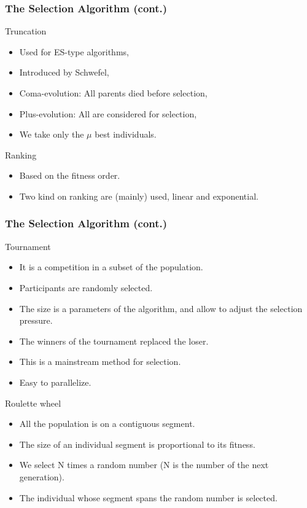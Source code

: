\begin{frame}
  \frametitle{The Selection Algorithm (cont.)}
  \begin{block}{Truncation}
    \begin{itemize}
    \item Used for ES-type algorithms,
    \item Introduced by Schwefel\cite{schwefel1995},
    \item Coma-evolution: All parents died before selection,
    \item Plus-evolution: All are considered for selection,
    \item We take only the $\mu$ best individuals.
    \end{itemize}
  \end{block}

  \begin{block}{Ranking}
    \begin{itemize}
    \item Based on the fitness order.
    \item Two kind on ranking are (mainly) used, linear and exponential.
    \end{itemize}
  \end{block}
\end{frame}

\begin{frame}
  \frametitle{The Selection Algorithm (cont.)}
  \begin{block}{Tournament}
    \begin{itemize}
    \item It is a competition in a subset of the population.
    \item Participants are randomly selected.
    \item The size is a parameters of the algorithm, and allow to
      adjust the selection pressure.
    \item The winners of the tournament replaced the loser.
    \item This is a mainstream method for selection.
    \item Easy to parallelize.
    \end{itemize}
  \end{block}

  \begin{block}{Roulette wheel}
    \begin{itemize}
    \item All the population is on a contiguous segment.
    \item The size of an individual segment is proportional to its fitness.
    \item We select N times a random number (N is the number of the
      next generation).
    \item The individual whose segment spans the random number is selected.
    \end{itemize}
  \end{block}
\end{frame}


